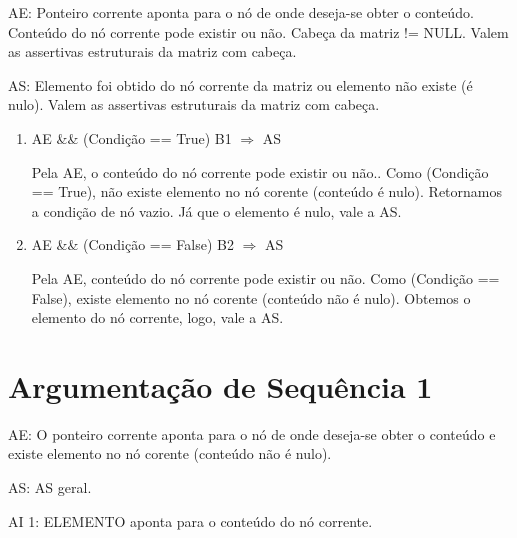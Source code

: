 \documentclass[a4paper,12pt,oneside]{book}
\begin{document}
AE: Ponteiro corrente aponta para o nó de onde deseja-se obter o conteúdo. Conteúdo do nó corrente pode existir ou não. Cabeça da matriz != NULL. Valem as assertivas estruturais da matriz com cabeça.


AS: Elemento foi obtido do nó corrente da matriz ou elemento não existe (é nulo). Valem as assertivas estruturais da matriz com cabeça.

\begin{enumerate}[label=\protect\circled{\arabic*}]
    \item AE \&\& (Condição == True) \circled{+} B1 $\Longrightarrow$ AS

          Pela AE, o conteúdo do nó corrente pode existir ou não.. Como (Condição == True), não existe elemento no nó corente (conteúdo é nulo). Retornamos a condição de nó vazio. Já que o elemento é nulo, vale a AS.

    \item AE \&\& (Condição == False) \circled{+} B2 $\Longrightarrow$ AS

    Pela AE, conteúdo do nó corrente pode existir ou não. Como (Condição == False), existe elemento no nó corente (conteúdo não é nulo). Obtemos o elemento do nó corrente, logo, vale a AS.

\end{enumerate}

\chapter{Argumentação de Sequência 1}

AE: O ponteiro corrente aponta para o nó de onde deseja-se obter o conteúdo e existe elemento no nó corente (conteúdo não é nulo).


AS: AS geral.


AI 1: ELEMENTO aponta para o conteúdo do nó corrente.
\end{document}
